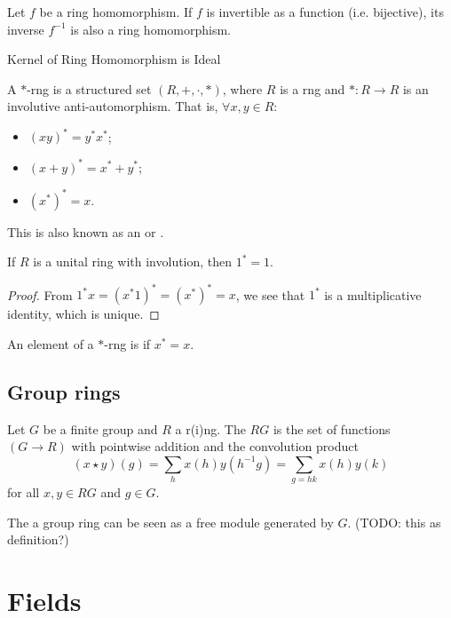 \begin{proposition}
Let $f$ be a ring homomorphism. If $f$ is invertible as a function (i.e. bijective), its inverse $f^{-1}$ is also a ring homomorphism.
\end{proposition}

\begin{proposition} \label{kernelIsIdeal}
Kernel of Ring Homomorphism is Ideal
\end{proposition}

\begin{definition}
A $*$-rng is a structured set $(R,+,\cdot, *)$, where $R$ is a rng and $*:R\to R$ is an involutive anti-automorphism. That is, $\forall x,y\in R$:
\begin{itemize}
\item $(xy)^* = y^*x^*$;
\item $(x+y)^* = x^* + y^*$;
\item $(x^*)^* = x$.
\end{itemize}
This is also known as an  or .
\end{definition}
\begin{lemma}
If $R$ is a unital ring with involution, then $1^* = 1$.
\end{lemma}
\begin{proof}
From $1^*x = (x^*1)^* = (x^*)^* = x$, we see that $1^*$ is a multiplicative identity, which is unique.
\end{proof}
\begin{definition}
An element of a $*$-rng is  if $x^* = x$.
\end{definition}

\section{Group rings}
\begin{definition}
Let $G$ be a finite group and $R$ a r(i)ng. The  $RG$ is the set of functions $(G\to R)$ with pointwise addition and the convolution product
\[ (x\star y)(g) = \sum_h x(h)y(h^{-1}g) = \sum_{g=hk}x(h)y(k) \]
for all $x,y\in RG$ and $g\in G$. 
\end{definition}
The a group ring can be seen as a free module generated by $G$. (TODO: this as definition?)



\chapter{Fields}
